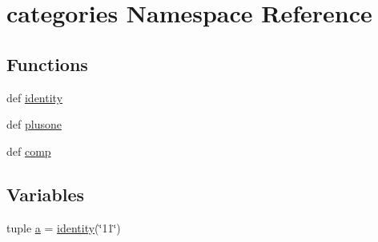\hypertarget{namespacecategories}{\section{categories Namespace Reference}
\label{namespacecategories}
}
\subsection*{Functions}
\begin{DoxyCompactItemize}
\item 
def \hyperlink{namespacecategories_ad5d3141fa655736c1fccef95069bf138}{identity}
\item 
def \hyperlink{namespacecategories_a8c3eb907e91bca8102418150ca6db3fd}{plusone}
\item 
def \hyperlink{namespacecategories_a4e763f6d2815828e12fcfea9bc54ddb8}{comp}
\end{DoxyCompactItemize}
\subsection*{Variables}
\begin{DoxyCompactItemize}
\item 
tuple \hyperlink{namespacecategories_aa6ad1b25eda2dc4703279de8c42636c3}{a} = \hyperlink{namespacecategories_ad5d3141fa655736c1fccef95069bf138}{identity}(\char`\"{}11\char`\"{})
\end{DoxyCompactItemize}


